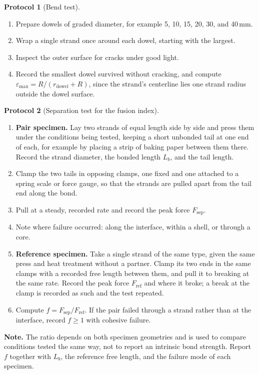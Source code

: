 \documentclass[11pt,openany]{book}
\theoremstyle{definition}
\newtheorem{protocol}{Protocol}[chapter]
\begin{document}
\begin{protocol}[Bend test]\label{prot:bend}
\begin{enumerate}
\item Prepare dowels of graded diameter, for example 5, 10, 15, 20, 30, and 40\,mm.
\item Wrap a single strand once around each dowel, starting with the largest.
\item Inspect the outer surface for cracks under good light.
\item Record the smallest dowel survived without cracking, and compute $\varepsilon_{\max} = R/(r_{\text{dowel}} + R)$, since the strand's centerline lies one strand radius outside the dowel surface.
\end{enumerate}
\end{protocol}

\begin{protocol}[Separation test for the fusion index]\label{prot:peel}
\begin{enumerate}
\item \textbf{Pair specimen.} Lay two strands of equal length side by side and press them under the conditions being tested, keeping a short unbonded tail at one end of each, for example by placing a strip of baking paper between them there. Record the strand diameter, the bonded length $L_b$, and the tail length.
\item Clamp the two tails in opposing clamps, one fixed and one attached to a spring scale or force gauge, so that the strands are pulled apart from the tail end along the bond.
\item Pull at a steady, recorded rate and record the peak force $F_{\text{sep}}$.
\item Note where failure occurred: along the interface, within a shell, or through a core.
\item \textbf{Reference specimen.} Take a single strand of the same type, given the same press and heat treatment without a partner. Clamp its two ends in the same clamps with a recorded free length between them, and pull it to breaking at the same rate. Record the peak force $F_{\text{ref}}$ and where it broke; a break at the clamp is recorded as such and the test repeated.
\item Compute $f = F_{\text{sep}}/F_{\text{ref}}$. If the pair failed through a strand rather than at the interface, record $f \geq 1$ with cohesive failure.
\end{enumerate}
\textbf{Note.} The ratio depends on both specimen geometries and is used to compare conditions tested the same way, not to report an intrinsic bond strength. Report $f$ together with $L_b$, the reference free length, and the failure mode of each specimen.
\end{protocol}
\end{document}
